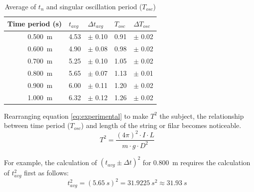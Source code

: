 \documentclass[a4paper,12pt]{article}
\theoremstyle{definition}
\begin{document}
\setlength{\extrarowheight}{3pt}
\begin{table}[h]
\begin{center}
\begin{tabular}{l||c|ll|ll} \toprule
\multicolumn{2}{l||}{Time period (\si{s}) }   &  $t_{avg}$ & $\Delta t_{avg}$ & $T_{osc}$ & $\Delta T_{osc}$ \\ \midrule
\parbox[t]{2mm}{} 
								   & \SI{0.500}{m}     &  4.53 & $\pm$ 0.10 &  0.91 &  $\pm$ 0.02\\
                                   & \SI{0.600}{m}    &  4.90 & $\pm$ 0.08 & 0.98 & $\pm$ 0.02\\
                                   & \SI{0.700}{m}    &    5.25 & $\pm$ 0.10  & 1.05 & $\pm$ 0.02\\
                                   & \SI{0.800}{m}     &   5.65 & $\pm$ 0.07   &  1.13 & $\pm$ 0.01\\
                                   	& \SI{0.900}{m}     &   6.00 &$\pm$ 0.11   & 1.20 & $\pm$ 0.02\\
                                   	& \SI{1.000}{m}     &   6.32 &$\pm$ 0.12   & 1.26 & $\pm$ 0.02\\
                       
\bottomrule
\end{tabular}
\end{center}
\caption{Average of $t_n$ and  singular oscillation period ($T_{osc}$)}
\label{tab:processeddata}
\end{table}

Rearranging equation \ref{eq:experimental} to make $T^2$ the subject, the relationship between time period ($T_{osc}$) and length of the string or filar becomes noticeable.
\begin{equation}\label{eq:timeassubject}
	T^2=\frac{(4 \pi)^2 \cdot I \cdot L}{m \cdot g \cdot D^2}
\end{equation}

For example, the calculation of $(t_{avg} \pm \Delta t)^2$ for \SI{0.800}{m} requires the calculation of $t_{avg}^2$ first as follows:
\begin{equation*}
	t_{avg}^2 = (\SI{5.65}{s})^2=\SI{31.9225}{s^2} \approx \SI{31.93}{s}
\end{equation*}
\end{document}
